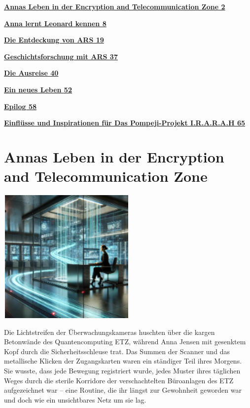 \documentclass[
]{article}
\begin{document}
\hyperref[annas-leben-in-der-encryption-and-telecommunication-zone]{\textbf{Annas
Leben in der Encryption and Telecommunication Zone 2}}

\hyperref[anna-lernt-leonard-kennen]{\textbf{Anna lernt Leonard kennen
8}}

\hyperref[die-entdeckung-von-ars]{\textbf{Die Entdeckung von ARS 19}}

\hyperref[geschichtsforschung-mit-ars]{\textbf{Geschichtsforschung mit
ARS 37}}

\hyperref[die-ausreise]{\textbf{Die Ausreise 40}}

\hyperref[ein-neues-leben]{\textbf{Ein neues Leben 52}}

\hyperref[epilog]{\textbf{Epilog 58}}

\hyperref[einfluxfcsse-und-inspirationen-fuxfcr-das-pompeji-projekt-i.r.a.r.a.h]{\textbf{Einflüsse
und Inspirationen für Das Pompeji-Projekt I.R.A.R.A.H 65}}

\section{Annas Leben in der Encryption and Telecommunication
Zone}\label{annas-leben-in-der-encryption-and-telecommunication-zone}

\includegraphics[width=2.64583in,height=2.59375in]{media/image0002.png}

Die Lichtstreifen der Überwachungskameras huschten über die kargen
Betonwände des Quantencomputing ETZ, während Anna Jensen mit gesenktem
Kopf durch die Sicherheitsschleuse trat. Das Summen der Scanner und das
metallische Klicken der Zugangskarten waren ein ständiger Teil ihres
Morgens. Sie wusste, dass jede Bewegung registriert wurde, jedes Muster
ihres täglichen Weges durch die sterile Korridore der verschachtelten
Büroanlagen des ETZ aufgezeichnet war -- eine Routine, die ihr längst
zur Gewohnheit geworden war und doch wie ein unsichtbares Netz um sie
lag.
\end{document}
